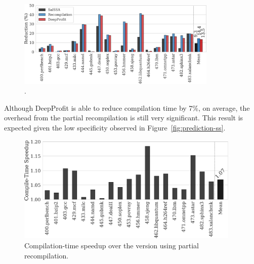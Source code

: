 \begin{figure}[h]
  \centering
  \includegraphics[width=0.85\textwidth]{src/deeplearning/figs/code-size-reduction-threshold-tuning.pdf}
  \caption{.}
  \label{fig:code-size-reduction}
\end{figure}

Although DeepProfit is able to reduce compilation time by 7\%, on average, the overhead from the partial recompilation is still very significant.
This result is expected given the low specificity observed in Figure~\ref{fig:prediction-ss}.


\begin{figure}[h]
  \centering
  \includegraphics[width=0.95\textwidth]{src/deeplearning/figs/compilation-time-speedup.pdf}
  \caption{Compilation-time speedup over the version using partial recompilation.}
  \label{fig:compilation-time-speedup}
\end{figure}

